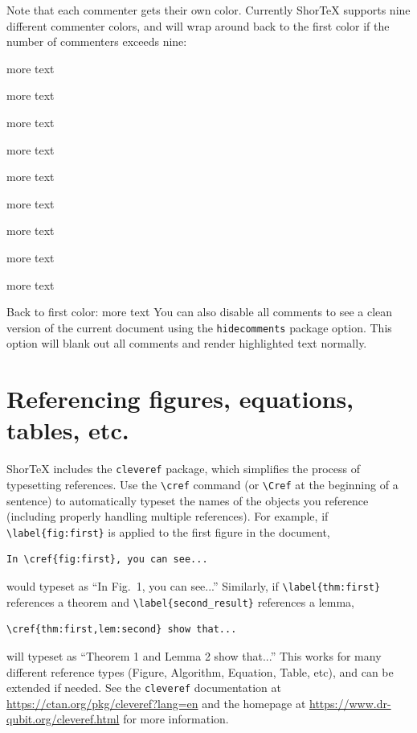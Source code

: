 \documentclass{article}
\begin{document}
Note that each commenter gets their own color. Currently ShorTeX supports nine different commenter colors,
and will wrap around back to the first color if the number of commenters exceeds nine:
\bitem
\setlength{\itemsep}{0pt}
\item {}more text
\item {}more text
\item {}more text
\item {}more text
\item {}more text
\item {}more text
\item {}more text
\item {}more text
\item {}more text
\item Back to first color: more text
\eitem
You can also disable all comments to see a clean version of the current
document using the \verb!hidecomments! package option.
This option will blank out all comments and render highlighted text normally.

\newpage
\section{Referencing figures, equations, tables, etc.}

ShorTeX includes the \texttt{cleveref} package, which simplifies the process
of typesetting references. Use the \verb!\cref! command (or \verb!\Cref! at the beginning of a sentence)
to automatically typeset the names of the objects you reference (including properly handling multiple references).
For example, if \verb!\label{fig:first}! is applied to the first figure in the document,
\begin{verbatim}
In \cref{fig:first}, you can see...
\end{verbatim}
would typeset as ``In Fig.~1, you can see...''
Similarly, if \verb!\label{thm:first}! references a theorem and \verb!\label{second_result}! references
a lemma,
\begin{verbatim}
\cref{thm:first,lem:second} show that...
\end{verbatim}
will typeset as ``Theorem 1 and Lemma 2 show that...''
This works for many different reference types (Figure, Algorithm, Equation, Table, etc),
and can be extended if needed. See the \texttt{cleveref} documentation
at \url{https://ctan.org/pkg/cleveref?lang=en} and the homepage at \url{https://www.dr-qubit.org/cleveref.html}
for more information.
\end{document}
